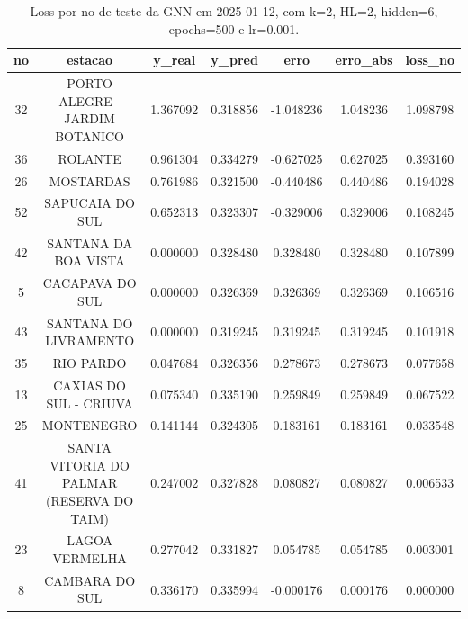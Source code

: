 \begin{table}[h]
\centering
\caption{Loss por no de teste da GNN em 2025-01-12, com k=2, HL=2, hidden=6, epochs=500 e lr=0.001.}
\label{tab:gnn_loss_k2_hl2_h6_e500_d20250112}
\begin{tabular}{ccccccc}
\toprule
no & estacao & y\_real & y\_pred & erro & erro\_abs & loss\_no \\
\midrule
32 & PORTO ALEGRE - JARDIM BOTANICO & 1.367092 & 0.318856 & -1.048236 & 1.048236 & 1.098798 \\
36 & ROLANTE & 0.961304 & 0.334279 & -0.627025 & 0.627025 & 0.393160 \\
26 & MOSTARDAS & 0.761986 & 0.321500 & -0.440486 & 0.440486 & 0.194028 \\
52 & SAPUCAIA DO SUL & 0.652313 & 0.323307 & -0.329006 & 0.329006 & 0.108245 \\
42 & SANTANA DA BOA VISTA & 0.000000 & 0.328480 & 0.328480 & 0.328480 & 0.107899 \\
5 & CACAPAVA DO SUL & 0.000000 & 0.326369 & 0.326369 & 0.326369 & 0.106516 \\
43 & SANTANA DO LIVRAMENTO & 0.000000 & 0.319245 & 0.319245 & 0.319245 & 0.101918 \\
35 & RIO PARDO & 0.047684 & 0.326356 & 0.278673 & 0.278673 & 0.077658 \\
13 & CAXIAS DO SUL - CRIUVA & 0.075340 & 0.335190 & 0.259849 & 0.259849 & 0.067522 \\
25 & MONTENEGRO & 0.141144 & 0.324305 & 0.183161 & 0.183161 & 0.033548 \\
41 & SANTA VITORIA DO PALMAR (RESERVA DO TAIM) & 0.247002 & 0.327828 & 0.080827 & 0.080827 & 0.006533 \\
23 & LAGOA VERMELHA & 0.277042 & 0.331827 & 0.054785 & 0.054785 & 0.003001 \\
8 & CAMBARA DO SUL & 0.336170 & 0.335994 & -0.000176 & 0.000176 & 0.000000 \\
\bottomrule
\end{tabular}
\end{table}
